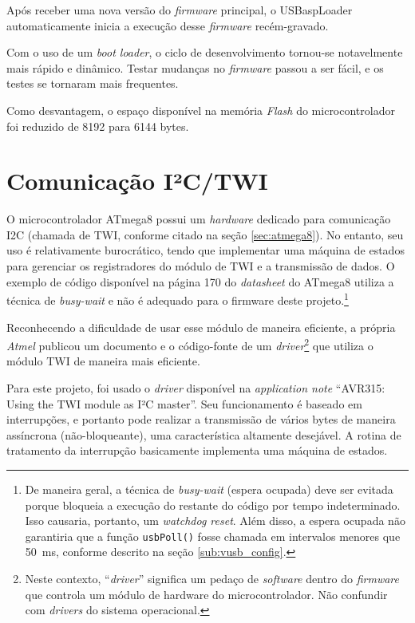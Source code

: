 \documentclass[brazil,pagestart=firstchapter]{abnt}
\begin{document}
Após receber uma nova versão do \textit{firmware} principal, o USBaspLoader
automaticamente inicia a execução desse \textit{firmware} recém-gravado.

Com o uso de um \textit{boot loader}, o ciclo de desenvolvimento tornou-se
notavelmente mais rápido e dinâmico. Testar mudanças no \textit{firmware}
passou a ser fácil, e os testes se tornaram mais frequentes.

Como desvantagem, o espaço disponível na memória \textit{Flash} do
microcontrolador foi reduzido de \num{8192} para \num{6144} bytes.


\section{Comunicação I²C/TWI}
\label{sec:twi}

O microcontrolador ATmega8 possui um \textit{hardware} dedicado para
comunicação \ac{I2C} (chamada de \ac{TWI}, conforme citado na seção
\ref{sec:atmega8}). No entanto, seu uso é relativamente burocrático, tendo
que implementar uma máquina de estados para gerenciar os registradores do
módulo de \ac{TWI} e a transmissão de dados. \cite[p.~168]{ATmega8} O
exemplo de código disponível na página 170 do \textit{datasheet} do ATmega8
utiliza a técnica de \textit{busy-wait} e não é adequado para o firmware
deste projeto.\footnote{
	De maneira geral, a técnica de \textit{busy-wait} (espera ocupada) deve
	ser evitada porque bloqueia a execução do restante do código por tempo
	indeterminado. Isso causaria, portanto, um \textit{watchdog reset}. Além
	disso, a espera ocupada não garantiria que a função \texttt{usbPoll()}
	fosse chamada em intervalos menores que \SI{50}{\milli\second}, conforme
	descrito na seção \ref{sub:vusb_config}.}

Reconhecendo a dificuldade de usar esse módulo de maneira eficiente, a
própria \textit{Atmel} publicou um documento e o código-fonte de um
\textit{driver}\footnote{
	Neste contexto, ``\textit{driver}'' significa um pedaço de
	\textit{software} dentro do \textit{firmware} que controla um módulo de
	hardware do microcontrolador. Não confundir com \textit{drivers} do
	sistema operacional.}
que utiliza o módulo \ac{TWI} de maneira mais eficiente. \cite{AVR315}

Para este projeto, foi usado o \textit{driver} disponível na
\textit{application note} ``AVR315: Using the TWI module as I²C master''.
Seu funcionamento é baseado em interrupções, e portanto pode realizar a
transmissão de vários bytes de maneira assíncrona (não-bloqueante), uma
característica altamente desejável. A rotina de tratamento da interrupção
basicamente implementa uma máquina de estados. \cite[p.~13]{AVR315}
\end{document}
